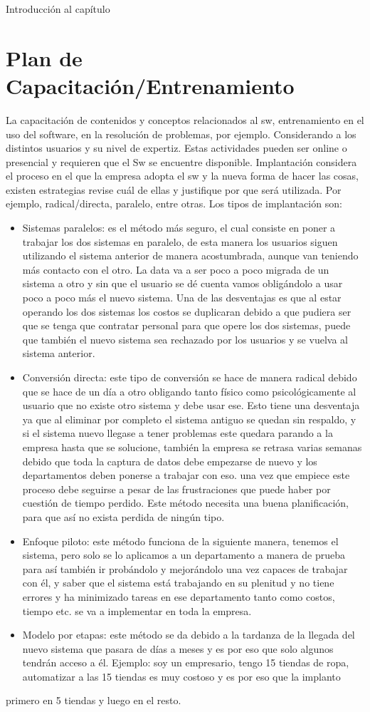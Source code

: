 
Introducción al capítulo


\section{Plan de Capacitación/Entrenamiento}
La capacitación de contenidos y conceptos relacionados al sw, entrenamiento en el uso del software, en la resolución de problemas, por ejemplo. Considerando a los distintos usuarios y su nivel de expertiz. Estas actividades pueden ser online o presencial y requieren que el Sw se encuentre disponible.
Implantación considera el proceso en el que la empresa adopta el sw y la nueva forma de hacer las cosas, existen estrategias revise cuál de ellas y justifique por que será utilizada. Por ejemplo, radical/directa, paralelo, entre otras. Los tipos de implantación son:
\begin{itemize}
    \item Sistemas paralelos: es el método más seguro, el cual consiste en poner a trabajar los dos sistemas en paralelo, de esta manera los usuarios siguen utilizando el sistema anterior de manera acostumbrada, aunque van teniendo más contacto con el otro. La data va a ser poco a poco migrada de un sistema a otro y sin que el usuario se dé cuenta vamos obligándolo a usar poco a poco más el nuevo sistema. Una de las desventajas es que al estar operando los dos sistemas los costos se duplicaran debido a que pudiera ser que se tenga que contratar personal para que opere los dos sistemas, puede que también el nuevo sistema sea rechazado por los usuarios y se vuelva al sistema anterior.
    \item Conversión directa: este tipo de conversión se hace de manera radical debido que se hace de un día a otro obligando tanto físico como psicológicamente al usuario que no existe otro sistema y debe usar ese. Esto tiene una desventaja ya que al eliminar por completo el sistema antiguo se quedan sin respaldo, y si el sistema nuevo llegase a tener problemas este quedara parando a la empresa hasta que se solucione, también la empresa se retrasa varias semanas debido que toda la captura de datos debe empezarse de nuevo y los departamentos deben ponerse a trabajar con eso. una vez que empiece este proceso debe seguirse a pesar de las frustraciones que puede haber por cuestión de tiempo perdido. Este método necesita una buena planificación, para que así no exista perdida de ningún tipo.
    \item Enfoque piloto:   este método funciona de la siguiente manera, tenemos el sistema, pero solo se lo aplicamos a un departamento a manera de prueba para así también ir probándolo y mejorándolo una vez capaces de trabajar con él, y saber que el sistema está trabajando en su plenitud y no tiene errores y ha minimizado tareas en ese departamento tanto como costos, tiempo etc. se va a implementar en toda la empresa.
    \item Modelo por etapas: este método se da debido a la tardanza de la llegada del nuevo sistema que pasara de días a meses y es por eso que solo algunos tendrán acceso a él. Ejemplo: soy un empresario, tengo 15 tiendas de ropa, automatizar a las 15 tiendas es muy costoso y es por eso que la implanto
\end{itemize} primero en 5 tiendas y luego en el resto.
